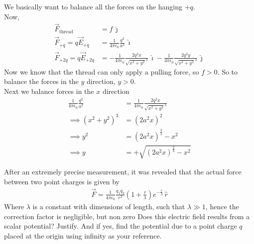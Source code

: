 \documentclass[../main.tex]{subfiles}
\begin{document}
\begin{questions}
\begin{solution}
\begin{center}
	\end{center}
	We basically want to balance all the forces on the hanging $+q$. \\
	Now,
	\begin{align}
		\vec{F}_{\text{thread}} &= f\,\hat{\jmath} \\
		\vec{F}_{+q} = q\vec{E}_{+q} &= \frac{1}{4\pi\epsilon_0}\frac{q^2}{a^2}\,\hat{\imath} \\
		\vec{F}_{+2q} = q\vec{E}_{+2q} &= -\frac{1}{4\pi\epsilon_0}\frac{2q^2x}{\sqrt{x^2+y^2}^3}\,\hat{\imath} -\frac{1}{4\pi\epsilon_0}\frac{2q^2y}{\sqrt{x^2+y^2}^3}\,\hat{\jmath}
	\end{align}
	Now we know that the thread can only apply a pulling force, so $f > 0$. So to balance the forces in the $y$ direction, $y > 0$. \\
	Next we balance forces in the $x$ direction
	\begin{align}
		\frac{1}{4\pi\epsilon_0}\frac{q^2}{a^2} &= \frac{1}{4\pi\epsilon_0}\frac{2q^2x}{\sqrt{x^2+y^2}^3} \\
		\implies {(x^2+y^2)}^3 &= (2a^2x)^2 \\
		\implies y^2 &= (2a^2x)^{\frac{2}{3}}-x^2 \\
		\implies y &= +\sqrt{(2a^2x)^{\frac{2}{3}}-x^2}
	\end{align}
\end{solution}

\question  After an extremely precise measurement, it was revealed that the actual force between two point charges is given by
\begin{align*}
	\vec{F}=\frac{1}{4 \pi \epsilon_{0}} \frac{q_{1} q_{2}}{r^{2}}\left(1+\frac{r}{\lambda}\right) e^{-\frac{r} {\lambda}}\,\hat{r}
\end{align*}
Where $\lambda$ is a  constant with dimensions of length, such that $\lambda \gg 1$, hence the correction factor is negligible, but non zero
\newline
Does this electric field results from a scalar potential? Justify. 
\newline 
And if yes, find the potential due to a point charge $q$ placed at the origin using infinity as your reference.


\end{questions}
\end{document}
